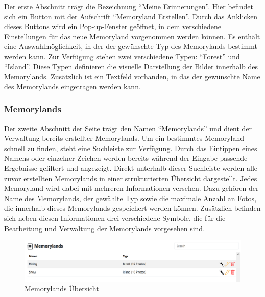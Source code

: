 
Der erste Abschnitt trägt die Bezeichnung ``Meine Erinnerungen''. Hier befindet 
sich ein Button mit der Aufschrift ``Memoryland Erstellen''. Durch das Anklicken 
dieses Buttons wird ein Pop-up-Fenster geöffnet, in dem verschiedene Einstellungen 
für das neue Memoryland vorgenommen werden können. Es enthält eine Auswahlmöglichkeit, 
in der der gewünschte Typ des Memorylands bestimmt werden kann. Zur Verfügung stehen 
zwei verschiedene Typen: ``Forest'' und ``Island''. Diese Typen definieren die 
visuelle Darstellung der Bilder innerhalb des Memorylands. Zusätzlich ist ein 
Textfeld vorhanden, in das der gewünschte Name des Memorylands eingetragen werden 
kann.



\subsubsection{Memorylands}

Der zweite Abschnitt der Seite trägt den Namen ``Memorylands'' und dient der 
Verwaltung bereits erstellter Memorylands. Um ein bestimmtes Memoryland schnell 
zu finden, steht eine Suchleiste zur Verfügung. Durch das Eintippen eines Namens 
oder einzelner Zeichen werden bereits während der Eingabe passende Ergebnisse 
gefiltert und angezeigt. Direkt unterhalb dieser Suchleiste werden alle zuvor 
erstellten Memorylands in einer strukturierten Übersicht dargestellt. Jedes 
Memoryland wird dabei mit mehreren Informationen versehen. Dazu gehören der 
Name des Memorylands, der gewählte Typ sowie die maximale Anzahl an Fotos, die 
innerhalb dieses Memorylands gespeichert werden können. Zusätzlich befinden sich 
neben diesen Informationen drei verschiedene Symbole, die für die Bearbeitung und 
Verwaltung der Memorylands vorgesehen sind.

\begin{figure} [h t]
    \centering
    \includegraphics[scale=0.6]{pics/all_worlds_teil2.PNG}
    \caption{Memorylands Übersicht}
    \label{fig:all-worlds-memorylands}
\end{figure}

